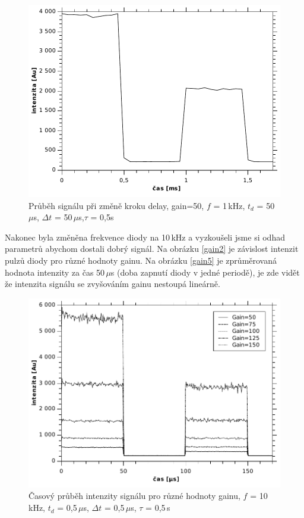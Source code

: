 \documentclass[12pt]{article}
\begin{document}
\begin{figure}[htbp]
\begin{center}
\includegraphics[width=12cm]{krokdelay.pdf}
\caption{Průběh signálu při změně kroku delay, gain=50, $f$ = 1\,kHz, $t_d$ = 50\,$\mu$s, $\Delta t$ = 50\,$\mu$s,\newline $\tau$ = 0,5s}
\label{krokdelay}
\end{center}
\end{figure}

Nakonec byla změněna frekvence diody na 10\,kHz a vyzkoušeli jsme si odhad parametrů abychom dostali dobrý signál. Na obrázku \ref{gain2} je závislost intenzit pulzů diody pro různé hodnoty gainu. Na obrázku \ref{gain5} je zprůměrovaná hodnota intenzity za čas 50\,$\mu$s (doba zapnutí diody v jedné periodě), je zde vidět že intenzita signálu se zvyšováním gainu nestoupá lineárně.

\begin{figure}[htbp]
\begin{center}
\includegraphics[width=12cm]{intensityformoregains.pdf}
\caption{Časový průběh intenzity signálu pro různé hodnoty gainu, $f$ = 10\,kHz, $t_d$ = 0,5\,$\mu$s, $\Delta t$ = 0,5\,$\mu$s, $\tau$ = 0,5\,s}
\label{gain3}
\end{center}
\end{figure}
\end{document}
